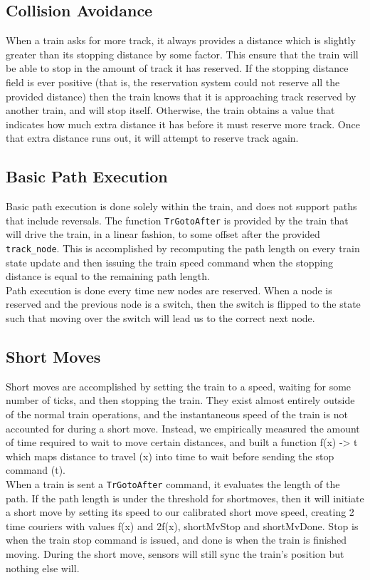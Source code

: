 \documentclass[12pt]{article}
\begin{document}
\subsection{Collision Avoidance}
When a train asks for more track, it always provides a distance which is slightly greater than its stopping distance by
some factor. This ensure that the train will be able to stop in the amount of track it has reserved. If the stopping
distance field is ever positive (that is, the reservation system could not reserve all the provided distance) then the
train knows that it is approaching track reserved by another train, and will stop itself. Otherwise, the train obtains a
value that indicates how much extra distance it has before it must reserve more track. Once that extra distance runs
out, it will attempt to reserve track again.

\subsection{Basic Path Execution}
Basic path execution is done solely within the train, and does not support paths that include reversals. The function
\texttt{TrGotoAfter} is provided by the train that will drive the train, in a linear fashion, to some offset after the
provided \texttt{track\_node}. This is accomplished by recomputing the path length on every train state update and then
issuing the train speed command when the stopping distance is equal to the remaining path length.
\\
Path execution is done every time new nodes are reserved. When a node is reserved and the previous node is a switch,
then the switch is flipped to the state such that moving over the switch will lead us to the correct next node.

\subsection{Short Moves}
Short moves are accomplished by setting the train to a speed, waiting for some number of ticks, and then stopping the
train. They exist almost entirely outside of the normal train operations, and the instantaneous speed of the train is
not accounted for during a short move. Instead, we empirically measured the amount of time required to wait to move
certain distances, and built a function f(x) -> t which maps distance to travel (x) into time to wait before sending the
stop command (t).
\\
When a train is sent a \texttt{TrGotoAfter} command, it evaluates the length of the path. If the path length is under
the threshold for shortmoves, then it will initiate a short move by setting its speed to our calibrated short move
speed, creating 2 time couriers with values f(x) and 2f(x), shortMvStop and shortMvDone. Stop is when the train
stop command is issued, and done is when the train is finished moving. During the short move, sensors will still sync
the train's position but nothing else will.
\end{document}
